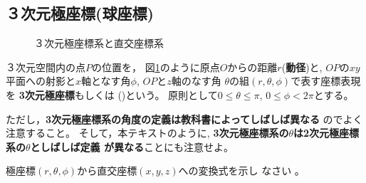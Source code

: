 \documentclass[twocolumn,11pt]{jarticle}
\begin{document}

\subsection{３次元極座標(球座標)}

\begin{figure}[h]
  \begin{center}
    \caption{３次元極座標系と直交座標系}
    \label{fig:polar-coord}
  \end{center}
\end{figure}
３次元空間内の点$P$の位置を，
図\ref{fig:polar-coord}のように原点$O$からの距離$r$(\textbf{動径})と,
$OP$の$xy$平面への射影と$x$軸となす角$\phi$, $OP$と$z$軸のなす角
$\theta$の組$(r, \theta, \phi)$で表す座標表現を
\textbf{3次元極座標}もしくは
()という。
原則として$0\le\theta\le\pi$, $0\le\phi<2\pi$とする。

ただし，\textbf{3次元極座標系の角度の定義は教科書によってしばしば異なる}
  のでよく注意すること。
そして，本テキストのように,
\textbf{3次元極座標系の$\theta$は2次元極座標系の$\theta$としばしば定義
  が異なる}ことにも注意せよ。

\question
 極座標$(r, \theta, \phi)$から直交座標$(x, y, z)$への変換式を示し
  なさい
  。
\end{document}
